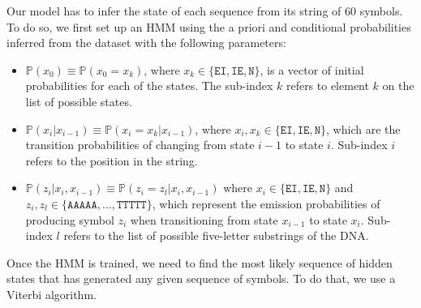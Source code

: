 \documentclass[a4paper, 11pt]{article} %
\begin{document}
Our model has to infer the state of each sequence from its string of 60 symbols. To do so, we first set up an HMM using the a priori and conditional probabilities inferred from the dataset with the following parameters:
\begin{itemize}
\item  $\mathbb{P}(x_0) \equiv \mathbb{P}(x_0 = x_{k})$, where $x_{k} \in \{\texttt{EI}, \texttt{IE}, \texttt{N} \}$, is a vector of initial probabilities for each of the states. The sub-index $k$ refers to element $k$ on the list of possible states.
\item $\mathbb{P}(x_i | x_{i-1}) \equiv \mathbb{P}(x_i = x_k | x_{i-1})$, where $x_{i}, x_{k} \in \{\texttt{EI}, \texttt{IE}, \texttt{N} \}$, which are the transition probabilities of changing from state $i-1$ to state $i$. Sub-index $i$ refers to the position in the string.
\item $\mathbb{P}(z_i | x_i, x_{i-1}) \equiv \mathbb{P}(z_i = z_l | x_i, x_{i-1})$ where $x_{i} \in \{\texttt{EI}, \texttt{IE}, \texttt{N} \}$ and $z_i, z_{l} \in \{\texttt{AAAAA}, \dots, \texttt{TTTTT}\}$, which represent the emission probabilities of producing symbol $z_{i}$ when transitioning from state $x_{i-1}$ to state $x_{i}$. Sub-index $l$ refers to the list of possible five-letter substrings of the DNA.
\end{itemize}

Once the HMM is trained, we need to find the most likely sequence of hidden states that has generated any given sequence of symbols. To do that, we use a Viterbi algorithm.
\end{document}
